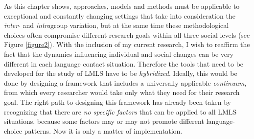 \documentclass[output=paper,
modfonts
]{langscibook}
\begin{document}
As this chapter shows, approaches, models and methods must be applicable to exceptional and constantly changing settings that take into consideration the \emph{inter}- and \emph{intra}group variation, but at the same time these methodological choices often compromise different research goals within all three social levels (see Figure \ref{figure2}). With the inclusion of my current research, I wish to reaffirm the fact that the dynamics influencing individual and social changes can be very different in each language contact situation. Therefore the tools that need to be developed for the study of LMLS have to be \emph{hybridized}. Ideally, this would be done by designing a framework that includes a universally applicable \emph{continuum}, from which every researcher would take only what they need for their research goal. The right path to designing this framework has already been taken by recognizing that there are \emph{no specific factors} that can be applied to all LMLS situations, because some factors may or may not promote different language-choice patterns. Now it is only a matter of implementation.

\printbibliography[heading=subbibliography,notkeyword=this]
\end{document}
